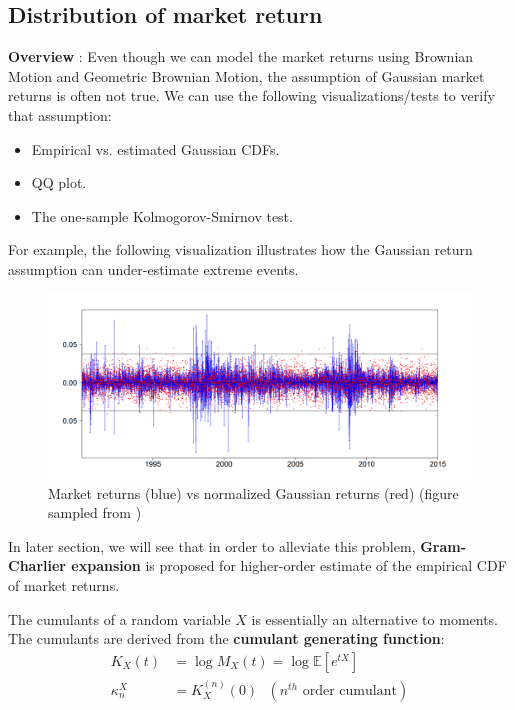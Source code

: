 \subsection{Distribution of market return}
\textbf{Overview} : Even though we can model the market returns using Brownian Motion and Geometric Brownian Motion, the assumption of Gaussian market returns is often not true. We can use the following visualizations/tests to verify that assumption:
\begin{itemize}
    \item Empirical vs. estimated Gaussian CDFs.
    \item QQ plot.
    \item The one-sample Kolmogorov-Smirnov test.
\end{itemize}

\noindent\newline For example, the following visualization illustrates how the Gaussian return assumption can under-estimate extreme events.
\begin{figure}[ht]
    \centering
    \includegraphics[width=\textwidth]{figures/emprical-vs-gaussian-cdf.png}
    \caption{Market returns (blue) vs normalized Gaussian returns (red) (figure sampled from \cite{book:privault})}
    \label{fig:empirical-vs-gaussian-cdfs}
\end{figure}

\noindent \newline In later section, we will see that in order to alleviate this problem, \textbf{Gram-Charlier expansion} is proposed for higher-order estimate of the empirical CDF of market returns.

\begin{definition}[Cumulants]
    The cumulants of a random variable $X$ is essentially an alternative to moments. The cumulants are derived from the \textbf{cumulant generating function}:
    \begin{align*}
        K_X(t) &= \log M_X(t) = \log \mathbb{E}[e^{tX}] \\
        \kappa_n^X &= K_X^{(n)}(0) \ \ \ (n^{th} \text{ order cumulant})
    \end{align*}
\end{definition}

